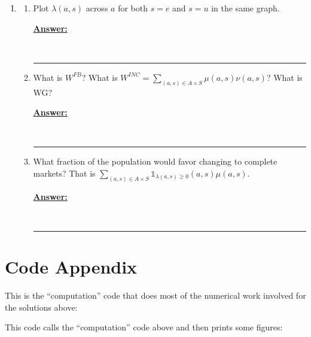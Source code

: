 \documentclass{article} %
\newcommand{\ifn}{\mathds{1}}
\theoremstyle{definition}
\newenvironment{solution}[1][Answer]{\begin{singlespace}\underline{\textbf{#1:}}\quad }{\ \rule{0.3em}{0.3em}\end{singlespace}} %
\begin{document}
\begin{enumerate}[I.]
\begin{enumerate}[4.]
\begin{enumerate}[a.]
\begin{solution}
				\end{solution}
			\end{enumerate}
		\end{enumerate}
		
		\item 
		\begin{enumerate}
			\item Plot $ \lambda(a,s) $ across $ a $ for both $ s = e $ and $ s = u $ in the same graph. 
			\begin{solution}
				
			\end{solution}
			\item What is $ W^{FB} $? What is $ W^{INC}  = \sum_{(a,s) \in A \times S} \mu(a,s) \nu(a,s) $? What is WG?
			\begin{solution}
				
			\end{solution}
			\item What fraction of the population would favor changing to complete markets? That is $   \sum_{(a,s) \in A \times S}   \ifn_{\lambda(a,s) \geq 0}  (a,s) \mu(a,s) $.
			\begin{solution}
				
			\end{solution}
		\end{enumerate}
	\end{enumerate}
\section*{Code Appendix}
This is the ``computation'' code that does most of the numerical work involved for the solutions above:

This code calls the ``computation'' code above and then prints some figures:
\end{document}
